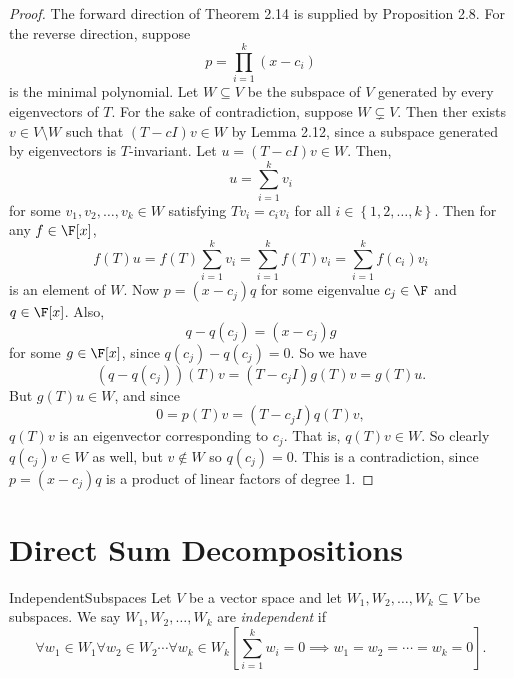 \documentclass[linearalgebraII]{subfiles}
\begin{document}
    \begin{proof}
        The forward direction of Theorem 2.14 is supplied by Proposition 2.8. For the reverse direction, suppose
        \begin{equation*}
            p = \prod^{k}_{i=1} \left( x-c_i \right) 
        \end{equation*}
        is the minimal polynomial. Let $W\subseteq V$ be the subspace of $V$ generated by every eigenvectors of $T$. For the sake of contradiction, suppose $W\subsetneq V$. Then ther exists $v\in V\setminus W$ such that $(T-cI)v\in W$ by Lemma 2.12, since a subspace generated by eigenvectors is $T$-invariant. Let $u = \left( T - cI \right)v\in W$. Then,
        \begin{equation*}
            u = \sum^{k}_{i=1} v_i
        \end{equation*}
        for some $v_1, v_2, \ldots, v_k\in W$ satisfying $Tv_i = c_iv_i$ for all $i\in \left\lbrace 1, 2, \ldots, k \right\rbrace$. Then for any $f\in \F[x]$,
        \begin{equation*}
            f(T)u = f(T) \sum^{k}_{i=1} v_i = \sum^{k}_{i=1} f(T)v_i = \sum^{k}_{i=1} f(c_i)v_i
        \end{equation*}
        is an element of $W$. Now $p = (x-c_j)q$ for some eigenvalue $c_j\in\F$ and $q\in \F[x]$. Also,
        \begin{equation*}
            q - q(c_j) = (x-c_j)g
        \end{equation*}
        for some $g\in\F[x]$, since $q(c_j) - q(c_j) = 0$. So we have
        \begin{equation*}
            \left( q -q(c_j) \right)(T)v = \left( T-c_jI \right) g(T)v = g(T)u.
        \end{equation*}
        But $g(T)u\in W$, and since
        \begin{equation*}
            0 = p(T)v = (T-c_jI)q(T)v,
        \end{equation*}
        $q(T)v$ is an eigenvector corresponding to $c_j$. That is, $q(T)v\in W$. So clearly $q(c_j)v\in W$ as well, but $v\notin W$ so $q(c_j) = 0$. This is a contradiction, since $p = (x-c_j)q$ is a product of linear factors of degree 1.
    \end{proof}

    \section{Direct Sum Decompositions}
    
    \begin{definition}{Independent}{Subspaces}
        Let $V$ be a vector space and let $W_1, W_2, \ldots, W_k\subseteq V$ be subspaces. We say $W_1, W_2, \ldots, W_k$ are \emph{independent} if
        \begin{equation*}
            \forall w_1\in W_1\forall w_2\in W_2\cdots\forall w_k\in W_k \left[ \sum^{k}_{i=1} w_i = 0 \implies w_1 = w_2 = \cdots = w_k = 0 \right]. 
        \end{equation*}
    \end{definition}
\end{document}
